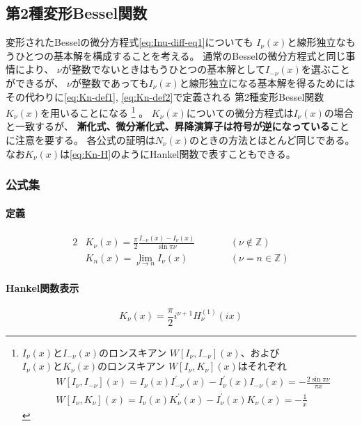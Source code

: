 \documentclass[../main/main]{subfiles}
\begin{document}
\subsection{第2種変形Bessel関数}

変形されたBesselの微分方程式\eqref{eq:Inu-diff-eq1}についても
$I_\nu(x)$と線形独立なもうひとつの基本解を構成することを考える。
通常のBesselの微分方程式と同じ事情により、
$\nu$が整数でないときはもうひとつの基本解として$I_{-\nu}(x)$を選ぶことができるが、
$\nu$が整数であっても$I_\nu(x)$と線形独立になる基本解を得るためには
その代わりに\eqref{eq:Kn-def1}, \eqref{eq:Kn-def2}で定義される
第2種変形Bessel関数$K_\nu(x)$を用いることになる
\footnote{$I_\nu(x)とI_{-\nu}(x)$のロンスキアン $W[I_\nu, I_{-\nu}] (x)$、および
$I_\nu(x)とK_{\nu}(x)$のロンスキアン $W[I_\nu, K_{\nu}] (x)$はそれぞれ
\begin{align}
  &W[I_\nu, I_{-\nu}] (x) = I_\nu (x) I_{-\nu}^\prime(x) - I_\nu^\prime(x) I_{-\nu}(x)
	= -\frac{2\sin \pi\nu}{\pi x} \\
  &W[I_\nu, K_{\nu}] (x) = I_\nu (x) K_{\nu}^\prime (x) - I_\nu^\prime(x) K_{\nu}(x)
	= -\frac{1}{x} 
\end{align}
}
。
$K_\nu(x)$についての微分方程式は$I_\nu(x)$の場合と一致するが、
\textbf{漸化式、微分漸化式、昇降演算子は符号が逆になっている}ことに注意を要する。
各公式の証明は$N_\nu(x)$のときの方法とほとんど同じである。
なお$K_\nu(x)$は\eqref{eq:Kn-H}のようにHankel関数で表すこともできる。

\subsubsection*{公式集}

\paragraph{定義}
\begin{alignat}{2}
  &K_\nu (x) = \frac{\pi}{2} \frac{I_{-\nu} (x) - I_{\nu}(x) }{ \sin\pi\nu} &\qquad & (\nu \notin \mathbb{Z})
	\label{eq:Kn-def1}\\
  &K_n (x) = \lim_{\nu\to n} I_\nu (x) & & (\nu = n \in \mathbb{Z})
	\label{eq:Kn-def2}
\end{alignat}

\paragraph{Hankel関数表示}
\begin{equation}\label{eq:Kn-H}
  K_\nu (x) = \frac{\pi}{2} i^{\nu+1} H_\nu^{(1)} (ix)
\end{equation}
\end{document}
